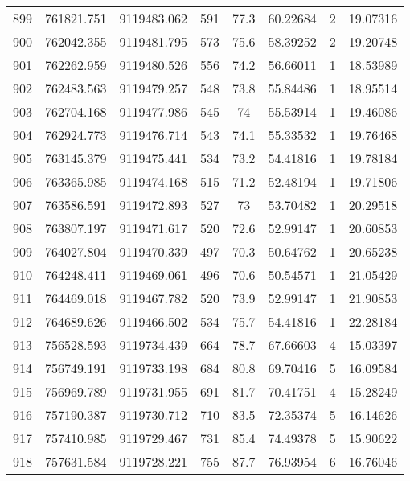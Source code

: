 \begin{longtable}{cccccccc}
899  & 761821.751      & 9119483.062      & 591     & 77.3  & 60.22684 & 2  & 19.07316 \\
900  & 762042.355      & 9119481.795      & 573     & 75.6  & 58.39252 & 2  & 19.20748 \\
901  & 762262.959      & 9119480.526      & 556     & 74.2  & 56.66011 & 1  & 18.53989 \\
902  & 762483.563      & 9119479.257      & 548     & 73.8  & 55.84486 & 1  & 18.95514 \\
903  & 762704.168      & 9119477.986      & 545     & 74    & 55.53914 & 1  & 19.46086 \\
904  & 762924.773      & 9119476.714      & 543     & 74.1  & 55.33532 & 1  & 19.76468 \\
905  & 763145.379      & 9119475.441      & 534     & 73.2  & 54.41816 & 1  & 19.78184 \\
906  & 763365.985      & 9119474.168      & 515     & 71.2  & 52.48194 & 1  & 19.71806 \\
907  & 763586.591      & 9119472.893      & 527     & 73    & 53.70482 & 1  & 20.29518 \\
908  & 763807.197      & 9119471.617      & 520     & 72.6  & 52.99147 & 1  & 20.60853 \\
909  & 764027.804      & 9119470.339      & 497     & 70.3  & 50.64762 & 1  & 20.65238 \\
910  & 764248.411      & 9119469.061      & 496     & 70.6  & 50.54571 & 1  & 21.05429 \\
911  & 764469.018      & 9119467.782      & 520     & 73.9  & 52.99147 & 1  & 21.90853 \\
912  & 764689.626      & 9119466.502      & 534     & 75.7  & 54.41816 & 1  & 22.28184 \\
913  & 756528.593      & 9119734.439      & 664     & 78.7  & 67.66603 & 4  & 15.03397 \\
914  & 756749.191      & 9119733.198      & 684     & 80.8  & 69.70416 & 5  & 16.09584 \\
915  & 756969.789      & 9119731.955      & 691     & 81.7  & 70.41751 & 4  & 15.28249 \\
916  & 757190.387      & 9119730.712      & 710     & 83.5  & 72.35374 & 5  & 16.14626 \\
917  & 757410.985      & 9119729.467      & 731     & 85.4  & 74.49378 & 5  & 15.90622 \\
918  & 757631.584      & 9119728.221      & 755     & 87.7  & 76.93954 & 6  & 16.76046 \\

\end{longtable}
